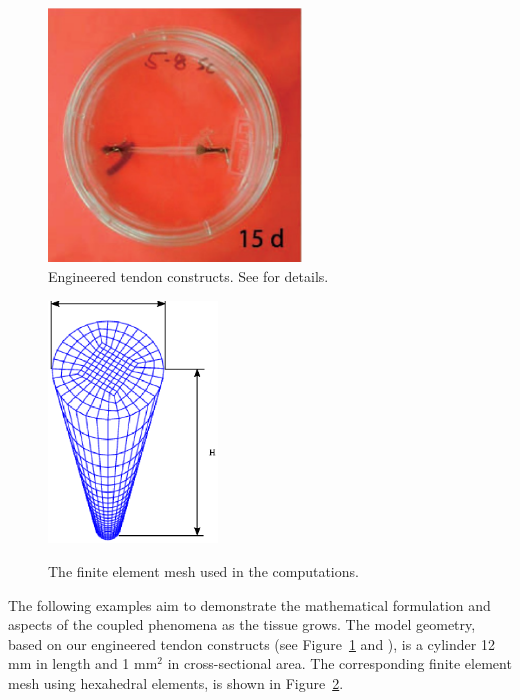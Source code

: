\begin{figure}[!hpt]
\centering
  \includegraphics[width=0.6\textwidth]{images/experiments/one-construct}
\caption{Engineered tendon constructs. See \citet{Calve:04} for
  details.} 
\label{engconst}
\end{figure}

\begin{figure}[!hpt]
  \centering
  {\includegraphics[width=0.4\textwidth]{images/examples/lagrangian/mesh}}
  \caption{The finite element mesh used in the computations.}
  \label{egmesh}
\end{figure}

The following examples aim to demonstrate the mathematical formulation
and aspects of the coupled phenomena as the tissue grows. The model
geometry, based on our engineered tendon constructs (see
Figure~\ref{engconst} and \citet{Calve:04}), is a cylinder 12 mm in length and 1 mm$^2$ in
cross-sectional area. The corresponding finite element mesh using
hexahedral elements, is shown in Figure~\ref{egmesh}.

